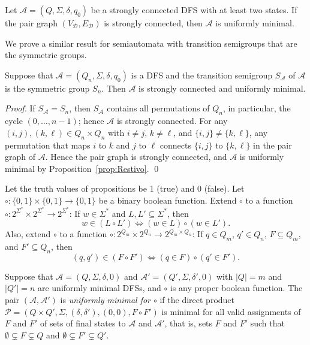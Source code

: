 \documentclass{llncs}
\newcommand{\emp}{\emptyset}
\newcommand{\Sig}{\Sigma}
\newcommand{\cA}{{\mathcal A}}
\newcommand{\cD}{{\mathcal D}}
\newcommand{\cP}{{\mathcal P}}
\begin{document}
\begin{proposition}
\label{prop:Restivo}
Let $\cA=(Q,\Sig,\delta,q_0)$ be a strongly connected DFS with at least two states. If the pair graph
$(V_\cD,E_\cD)$ is strongly connected, then $\cA$ is uniformly minimal.
\end{proposition}

We prove a similar result for semiautomata   with transition semigroups  that are the symmetric groups. 

\begin{proposition}
\label{prop:DFS}
Suppose that $\cA=(Q_n,\Sig,\delta,q_0)$ is a DFS and the transition semigroup $S_\cA$ of $\cA$ is the symmetric group $S_n$. Then $\cA$ is strongly connected and uniformly minimal.
\end{proposition}
\begin{proof}
If  $S_\cA=S_n$, then $S_\cA$ contains all permutations of $Q_n$, in particular, the cycle $(0,\dots,n-1)$; hence $\cA$ is strongly connected. For any $(i,j), (k,\ell)\in Q_n\times Q_n$ with $i\neq j$, $k\neq \ell$, and $\{i,j\}\neq \{k,\ell\}$,  any permutation that maps $i$ to $k$ and $j$ to $\ell$ connects $\{i,j\}$ to $\{k,\ell\}$ in the pair graph of $\cA$. Hence the pair graph is strongly connected, and $\cA$ is uniformly minimal by Proposition~\ref{prop:Restivo}.
\qed
\end{proof}


Let the truth values of propositions be 1 (true) and 0 (false). Let $\circ\colon \{0,1\}\times \{0,1\} \to \{0,1\}$ be a binary boolean function.
Extend $\circ$ to a function
$\circ\colon 2^{\Sig^*}\times 2^{\Sig^*}\to 2^{\Sig^*}$:
If $w\in \Sig^*$ and $L,L'\subseteq \Sig^*$, 
then $$w\in (L\circ L') \Leftrightarrow (w\in L) \circ (w\in L').$$
Also, extend $\circ$ to a function
$\circ\colon 2^{Q_m}\times 2^{Q_n}\to 2^{Q_m\times Q_n}$:
If $q\in Q_m$, $q'\in Q_n$, $F\subseteq Q_m$, and $F'\subseteq Q_n$, 
then $$(q,q')\in (F\circ F') \Leftrightarrow (q\in F) \circ (q'\in F').$$


Suppose that $\cA=(Q,\Sig, \delta,0)$ and $\cA'=(Q',\Sig, \delta',0)$ with $|Q|=m$ and $|Q'|=n$ are uniformly minimal DFSs, and 
$\circ$ is any proper boolean function.
The pair  $(\cA, \cA')$  is \emph{uniformly minimal for $\circ$}
if the direct product $\cP=(Q\times Q', \Sig, (\delta,\delta'), (0,0), F\circ F')$
is minimal for all valid assignments of $F$ and $F'$ of sets of final states to $\cA$ and $\cA'$, that is, sets $F$ and $F'$ such that $\emp\subsetneq F\subsetneq Q$ and $\emp\subsetneq F'\subsetneq Q'$.
\end{document}
